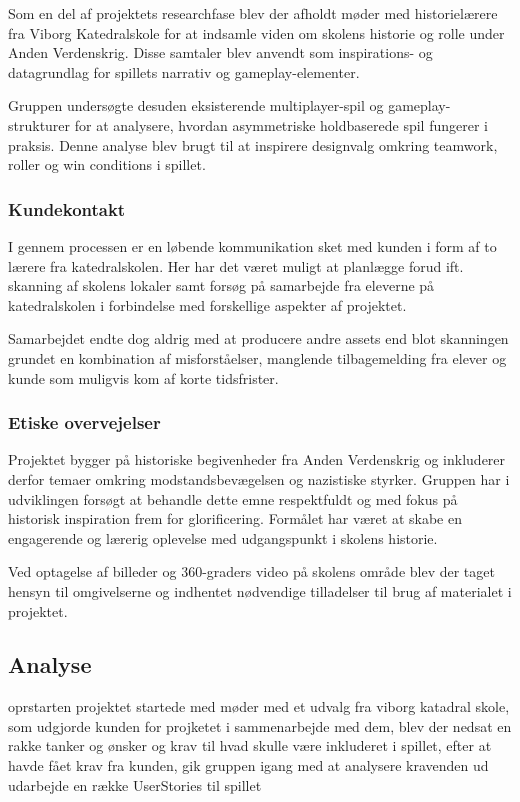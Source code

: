 Som en del af projektets researchfase blev der afholdt møder med historielærere fra Viborg Katedralskole for at indsamle viden om skolens historie og rolle under Anden Verdenskrig. Disse samtaler blev anvendt som inspirations- og datagrundlag for spillets narrativ og gameplay-elementer.

Gruppen undersøgte desuden eksisterende multiplayer-spil og gameplay-strukturer for at analysere, hvordan asymmetriske holdbaserede spil fungerer i praksis. Denne analyse blev brugt til at inspirere designvalg omkring teamwork, roller og win conditions i spillet.

\subsubsection{Kundekontakt}

I gennem processen er en løbende kommunikation sket med kunden i form af to lærere fra katedralskolen. Her har det været muligt at planlægge forud ift. skanning af skolens lokaler samt forsøg på samarbejde fra eleverne på katedralskolen i forbindelse med forskellige aspekter af projektet. 

Samarbejdet endte dog aldrig med at producere andre assets end blot skanningen grundet en kombination af misforståelser, manglende tilbagemelding fra elever og kunde som muligvis kom af korte tidsfrister. 

\subsubsection{Etiske overvejelser}

Projektet bygger på historiske begivenheder fra Anden Verdenskrig og inkluderer derfor temaer omkring modstandsbevægelsen og nazistiske styrker. Gruppen har i udviklingen forsøgt at behandle dette emne respektfuldt og med fokus på historisk inspiration frem for glorificering. Formålet har været at skabe en engagerende og lærerig oplevelse med udgangspunkt i skolens historie.

Ved optagelse af billeder og 360-graders video på skolens område blev der taget hensyn til omgivelserne og indhentet nødvendige tilladelser til brug af materialet i projektet.

\subsection{Analyse}
oprstarten projektet startede med møder med et udvalg fra viborg katadral skole, som udgjorde kunden for projketet i sammenarbejde med dem, blev der nedsat en rakke tanker og ønsker og krav til hvad skulle være inkluderet i spillet, efter at havde fået krav fra kunden, gik gruppen igang med at analysere kravenden ud udarbejde en række UserStories til spillet


